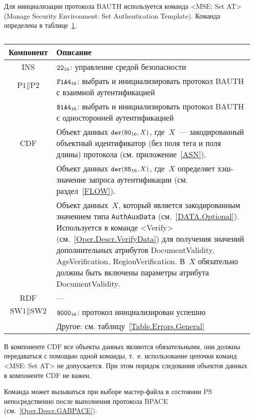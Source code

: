 Для инициализации протокола BAUTH используется команда <MSE: Set AT> 
(Manage Security Environment: Set Authentication Template).
Команда определена в таблице~\ref{Table.Oper.SetBAUTHCmd}.

\begin{table}[hbt]
\caption{}\label{Table.Oper.SetBAUTHCmd}
\begin{tabular}{|c|p{14cm}|}
\hline
Компонент & Описание \\
\hline
\hline
INS & $\texttt{22}_{16}$: управление средой безопасности\\ 
\hline
$\text{P1} \parallel\text{P2}$ & $\texttt{F1A4}_{16}$: выбрать и 
инициализировать протокол BAUTH с взаимной 
аутентификацией \\ 
\cline{2-2}
 & $\texttt{B1A4}_{16}$: выбрать и инициализировать протокол BAUTH с 
односторонней аутентификацией\\
\hline
CDF & Объект данных 
$\texttt{der}(\texttt{80}_{16}, X)$, где~$X$~--- 
закодированный объектный идентификатор (без поля тега и поля 
длины) протокола (см. приложение~\ref{ASN}).\\
 & Объект данных $\texttt{der}(\texttt{85}_{16}, X)$, 
где~$X$ определяет хэш-значение запроса аутентификации (см. раздел~\ref{FLOW}).\\
 & Объект данных~$X$, который является 
закодированным значением типа \verb|AuthAuxData| (см.~\ref{DATA.Optional}). 
Используется в команде <Verify> (см.~\ref{Oper.Descr.VerifyData}) 
для получения значений дополнительных атрибутов DocumentValidity, 
AgeVerification, RegionVerification. В~$X$ 
обязательно должны быть включены параметры атрибута DocumentValidity.\\
\hline 
\hline
RDF &  --- \\
\hline
$\text{SW1} \parallel \text{SW2}$ 
  & $\texttt{9000}_{16}$: протокол инициализирован успешно \\
\cline{2-2}
  & Другое: см. таблицу~\ref{Table.Errors.General}\\
\hline
\end{tabular}
\end{table}

В компоненте CDF все объекты данных являются обязательными, 
они должны передаваться с помощью одной команды, 
т.~е. использование цепочки команд <MSE: Set AT> не допускается. 
При этом порядок следования объектов данных в компоненте CDF не важен. 

Команда может вызываться при выборе мастер-файла в состоянии PS 
непосредственно после выполнения протокола BPACE 
(см.~\ref{Oper.Descr.GABPACE}). 

